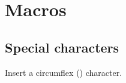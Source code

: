 \documentclass[11pt, cm-default]{l3doc}
\begin{document}
	\newpage
	
	\section{Macros}
	\subsection{Special characters}
	\begin{function}{\cir}
		\begin{syntax}
		\end{syntax}
		Insert a circumflex (\cir) character.
	\end{function}





\end{document}

